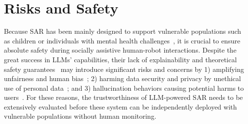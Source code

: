 \documentclass[
twocolumn,
]{ceurart}
\begin{document}



\section{Risks and Safety}

Because SAR has been mainly designed to support vulnerable populations such as children or individuals with mental health challenges~\cite{mataric2016socially}, it is crucial to ensure absolute safety during socially assistive human-robot interactions. Despite the great success in LLMs' capabilities, their lack of explainability and theoretical safety guarantees~\cite{huang2023survey} may introduce significant risks and concerns by 1) amplifying unfairness and human bias~\cite{acerbi2023large}; 2) harming data security and privacy by unethical use of personal data~\cite{liyanage2020ethical}; and 3) hallucination behaviors causing potential harms to users~\cite{zhang2023siren}. For these reasons, the trustworthiness of LLM-powered SAR needs to be extensively evaluated before these system can be independently deployed with vulnerable populations without human monitoring.

\end{document}
